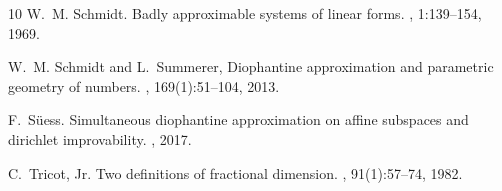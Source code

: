 \documentclass[10pt]{amsart}
\theoremstyle{definition}
\begin{document}
\begin{thebibliography}{10}
W.~M. Schmidt.
\newblock Badly approximable systems of linear forms.
, 1:139--154, 1969.

W.~M. Schmidt and L.~Summerer,
\newblock Diophantine approximation and parametric geometry of numbers.
, 169(1):51--104, 2013.

F.~S{\"u}ess.
\newblock Simultaneous diophantine approximation on affine subspaces and
  dirichlet improvability.
, 2017.

C.~Tricot, Jr.
\newblock Two definitions of fractional dimension.
, 91(1):57--74, 1982.



\end{thebibliography}

 
 
\end{document}
